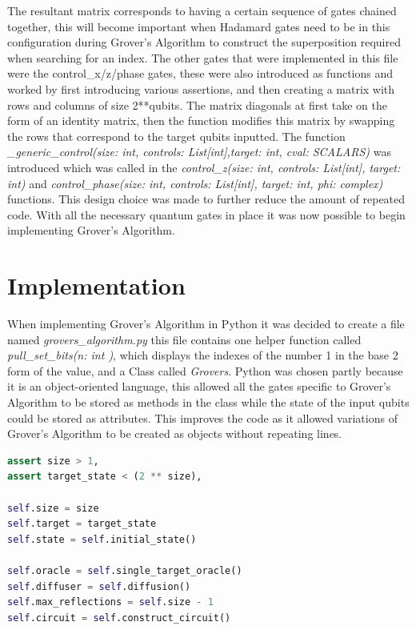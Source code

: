 \documentclass{article}
\begin{document}
The resultant matrix corresponds to having a certain sequence of gates chained together, this will become important when Hadamard gates need to be in this configuration during Grover's Algorithm to construct the superposition required when searching for an index. The other gates that were implemented in this file were the control\_x/z/phase gates, these were also introduced as functions and worked by first introducing various assertions, and then creating a matrix with rows and columns of size 2**qubits. The matrix diagonals at first take on the form of an identity matrix, then the function modifies this matrix by swapping the rows that correspond to the target qubits inputted. The function \textit{\_generic\_control(size: int, controls: List[int],target: int, cval: SCALARS)} was introduced which was called in the \textit{ control\_z(size: int, controls: List[int], target: int) } and \textit{control\_phase(size: int, controls: List[int], target: int, phi: complex)} functions. This design choice was made to further reduce the amount of repeated code. With all the necessary quantum gates in place it was now possible to begin implementing Grover’s Algorithm.

\pagebreak

\section{Implementation}

When implementing Grover's Algorithm in Python it was decided to create a file named \textit{grovers\_algorithm.py} this file contains one helper function called \textit{ pull\_set\_bits(n: int )}, which displays the indexes of the number 1 in the base 2 form of the value, and a Class called \textit{Grovers}. Python was chosen partly because it is an object-oriented language, this allowed all the gates specific to Grover’s Algorithm to be stored as methods in the class while the state of the input qubits could be stored as attributes. This improves the code as it allowed variations of Grover's Algorithm to be created as objects without repeating lines. 

\begin{file}
\begin{lstlisting}[language=Python]
assert size > 1, 
assert target_state < (2 ** size),

self.size = size
self.target = target_state
self.state = self.initial_state()

self.oracle = self.single_target_oracle()
self.diffuser = self.diffusion()
self.max_reflections = self.size - 1
self.circuit = self.construct_circuit()
\end{lstlisting}
\end{file}
\end{document}
